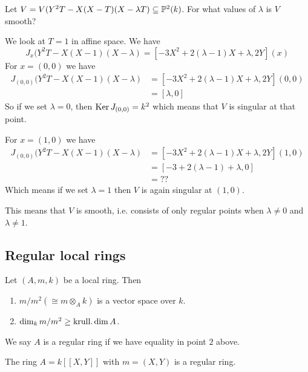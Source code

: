 \begin{problem}
Let $V = V(Y^2 T - X(X-T)(X-\lambda T)\subseteq \P^2(k)$. For what values of $\lambda$ is $V$ smooth?
\end{problem}
\begin{solution}
We look at $T=1$ in affine space. We have 
\begin{equation*}
    J_x(Y^2 T - X(X-1)(X-\lambda) = [-3X^2+2(\lambda-1)X+\lambda, 2Y](x)
\end{equation*}
For $x=(0,0)$ we have 
\begin{align*}
    J_{(0,0)}(Y^2 T - X(X-1)(X-\lambda) 
    &= [-3X^2+2(\lambda-1)X+\lambda, 2Y](0,0) \\
    &= [\lambda, 0]
\end{align*}
So if we set $\lambda = 0$, then $\Ker J_{(0,0)} = k^2$ which means that $V$ is singular at that point. 

For $x=(1,0)$ we have
\begin{align*}
    J_{(0,0)}(Y^2 T - X(X-1)(X-\lambda) 
    &= [-3X^2+2(\lambda-1)X+\lambda, 2Y](1,0) \\
    &= [-3+2(\lambda - 1)+\lambda, 0] \\
    &= ??
\end{align*}
Which means if we set $\lambda = 1$ then $V$ is again singular at $(1,0)$. 

This means that $V$ is smooth, i.e. consists of only regular points when $\lambda \neq 0$ and $\lambda \neq 1$. 
\end{solution}



\subsection{Regular local rings}

Let $(A, m, k)$ be a local ring. Then 
\begin{enumerate}
    \item $m/m^2 (\cong m\otimes_A k)$ is a vector space over $k$.
    \item $\dim_k m/m^2 \geq \kdim A$. 
\end{enumerate}

\begin{definition}
We say $A$ is a regular ring if we have equality in point $2$ above. 
\end{definition}

\begin{example}
The ring $A=k[[X,Y]]$ with $m=(X, Y)$ is a regular ring.
\end{example}

